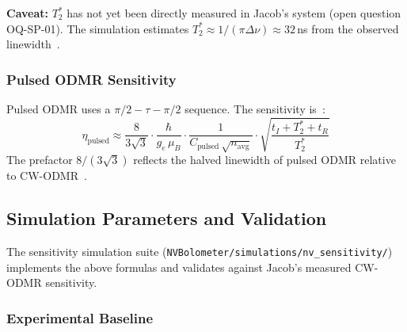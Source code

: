 \textbf{Caveat:} $T_2^*$ has not yet been directly measured in Jacob's system (open
question OQ-SP-01). The simulation estimates $T_2^* \approx 1/(\pi\Delta\nu)
\approx 32$\,ns from the observed linewidth~\cite{Barry2020}. %

\subsubsection{Pulsed ODMR Sensitivity}
\label{sec:pulsed_sensitivity}

Pulsed ODMR uses a $\pi/2 - \tau - \pi/2$ sequence. The sensitivity is~\cite{Barry2020}: %
\begin{equation}
  \eta_\mathrm{pulsed} \approx \frac{8}{3\sqrt{3}}
    \cdot \frac{\hbar}{g_e\, \mu_B}
    \cdot \frac{1}{C_\mathrm{pulsed}\, \sqrt{n_\mathrm{avg}}}
    \cdot \sqrt{\frac{t_I + T_2^* + t_R}{T_2^*}}
  \label{eq:pulsed_sensitivity}
\end{equation}
The prefactor $8/(3\sqrt{3})$ reflects the halved linewidth of pulsed ODMR relative to
CW-ODMR~\cite{Barry2020}.

\subsection{Simulation Parameters and Validation}
\label{sec:sim_validation}

The sensitivity simulation suite (\texttt{NVBolometer/simulations/nv\_sensitivity/})
implements the above formulas and validates against Jacob's measured CW-ODMR sensitivity.

\subsubsection{Experimental Baseline}

